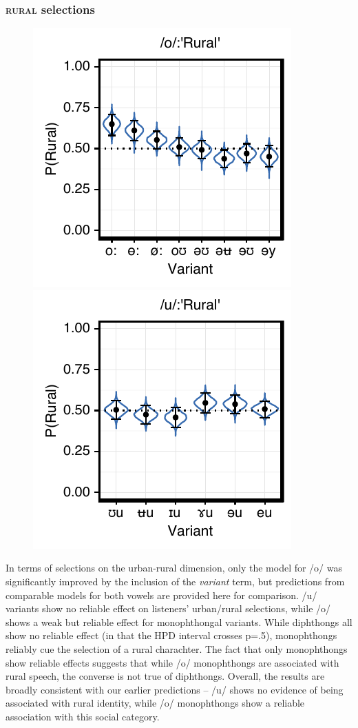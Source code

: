 \documentclass[PWPL]{article}
\begin{document}
\subsubsection{\textsc{rural} selections}
\begin{figure}[ht]
\centering
\includegraphics[scale=0.75]{ow_local.pdf}
\includegraphics[scale=0.75]{uw_local.pdf}
\end{figure}
In terms of selections on the urban-rural dimension, only the model for /o/ was significantly improved by the inclusion of the \textit{variant} term, but predictions from comparable models for both vowels are provided here for comparison. /u/ variants show no reliable effect on listeners' urban/rural selections, while /o/ shows a weak but reliable effect for monophthongal variants. While diphthongs all show no reliable effect (in that the HPD interval crosses p=.5), monophthongs reliably cue the selection of a rural charachter. The fact that only monophthongs show reliable effects suggests that while /o/ monophthongs are associated with rural speech, the converse is not true of diphthongs. Overall, the results are broadly consistent with our earlier predictions -- /u/ shows no evidence of being associated with rural identity, while /o/ monophthongs show a reliable association with this social category.
\end{document}
